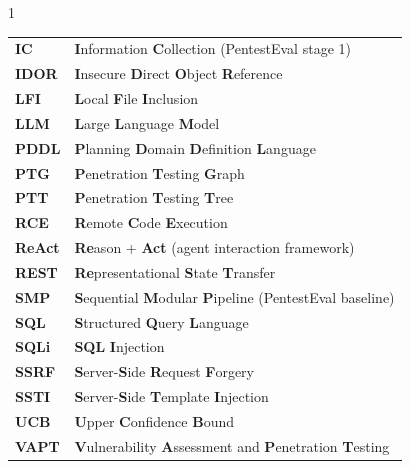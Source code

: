 \begin{spacing}{1}
\begin{tabular}{ll}
		\textbf{IC}      & \textbf{I}nformation \textbf{C}ollection (PentestEval stage 1)                              \\
		\textbf{IDOR}    & \textbf{I}nsecure \textbf{D}irect \textbf{O}bject \textbf{R}eference                        \\
		\textbf{LFI}     & \textbf{L}ocal \textbf{F}ile \textbf{I}nclusion                                             \\
		\textbf{LLM}     & \textbf{L}arge \textbf{L}anguage \textbf{M}odel                                             \\
		\textbf{PDDL}    & \textbf{P}lanning \textbf{D}omain \textbf{D}efinition \textbf{L}anguage                     \\
		\textbf{PTG}     & \textbf{P}enetration \textbf{T}esting \textbf{G}raph                                        \\
		\textbf{PTT}     & \textbf{P}enetration \textbf{T}esting \textbf{T}ree                                         \\
		\textbf{RCE}     & \textbf{R}emote \textbf{C}ode \textbf{E}xecution                                            \\
		\textbf{ReAct}   & \textbf{Re}ason + \textbf{Act} (agent interaction framework)                                \\
		\textbf{REST}    & \textbf{Re}presentational \textbf{S}tate \textbf{T}ransfer                                  \\
		\textbf{SMP}     & \textbf{S}equential \textbf{M}odular \textbf{P}ipeline (PentestEval baseline)               \\
		\textbf{SQL}     & \textbf{S}tructured \textbf{Q}uery \textbf{L}anguage                                        \\
		\textbf{SQLi}    & \textbf{SQL} \textbf{I}njection                                                             \\
		\textbf{SSRF}    & \textbf{S}erver-\textbf{S}ide \textbf{R}equest \textbf{F}orgery                             \\
		\textbf{SSTI}    & \textbf{S}erver-\textbf{S}ide \textbf{T}emplate \textbf{I}njection                          \\
		\textbf{UCB}     & \textbf{U}pper \textbf{C}onfidence \textbf{B}ound                                           \\
		\textbf{VAPT}    & \textbf{V}ulnerability \textbf{A}ssessment and \textbf{P}enetration \textbf{T}esting        \\

\end{tabular}
\end{spacing}
